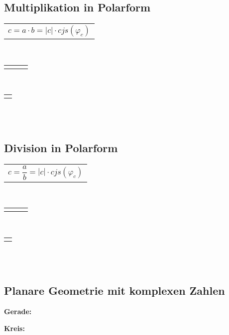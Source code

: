 \begin{minipage}[t]{0.5\textwidth}
	\subsection{Multiplikation in Polarform}
		\begin{tabular}{l}
			$c = a \cdot b = \left| c \right| \cdot cjs(\varphi_{c})$
		\end{tabular}\\[3pt]
		\begin{tabular}{lcl}
			\fbox{$\left| c \right| = \left| a \right| \cdot \left|b\right| = \left| a \cdot b \right|$} & \fbox{$\varphi_{c} = \varphi_{a} + \varphi_{b}$}
		\end{tabular}\\[3pt]
		\begin{tabular}{l}
			\fbox{$arg(c) = arg(a \cdot b) = arg(a) + arg(b)$}
		\end{tabular}\\[3pt]
		\scalebox{1}{}\\[3pt]
\end{minipage}
\begin{minipage}[t]{0.5\textwidth}
	\subsection{Division in Polarform}
		\begin{tabular}{l}
			$c = \dfrac{a}{b} = \left| c \right| \cdot cjs(\varphi_{c})$
		\end{tabular}\\[3pt]
		\begin{tabular}{lcl}
			\fbox{$\left| c \right| = \dfrac{\left| a \right|}{\left|b\right|} = \left| \dfrac{a}{b} \right|$} & \fbox{$\varphi_{c} = \varphi_{a} - \varphi_{b}$}
		\end{tabular}\\[3pt]
		\begin{tabular}{l}
			\fbox{$arg(c) = arg\left(\dfrac{a}{b}\right) = arg(a) - arg(b)$}
		\end{tabular}\\[3pt]
		\scalebox{1}{}\\[3pt]
\end{minipage}

\subsection{Planare Geometrie mit komplexen Zahlen}
	\begin{minipage}[c]{0.5\textwidth}
		\textbf{Gerade:}\\[3pt]
		\scalebox{1}{}
	\end{minipage}
	\begin{minipage}[c]{0.5\textwidth}
		\textbf{Kreis:}\\[3pt]
		\scalebox{1}{}
	\end{minipage}
	
